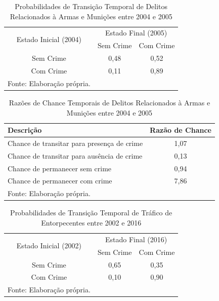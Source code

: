 \documentclass[12pt,openright,oneside,a4paper,english,french,spanish]{abntex2}
\numberwithin{table}{section} %
\numberwithin{figure}{section} %
\begin{document}
\begin{subappendices}
\begin{table}[H]
\centering
\caption{Probabilidades de Transição Temporal de Delitos Relacionados à Armas e Munições entre 2004 e 2005}
        \begin{tabular}{ccc}
            \hline
            \multirow{2}{*}{Estado Inicial (2004)} & \multicolumn{2}{c}{Estado Final (2005)}  \\\cline{2-3} 
                                     & \multicolumn{1}{l}{Sem Crime} & \multicolumn{1}{l}{Com Crime} \\\hline
            {Sem Crime} & {0,48} & {0,52} \\                \hline
            {Com Crime} & {0,11} & {0,89} \\                \hline
            \tiny Fonte: Elaboração própria.
        \end{tabular}
    \label{tab:prob_tempo_rel_arma_2004_2005}
\end{table}

\begin{table}[H]
\centering
\caption{Razões de Chance Temporais de Delitos Relacionados à Armas e Munições entre 2004 e 2005}
        \begin{tabular}{lc}
            \hline
            {\textbf{Descrição}} & {\textbf{Razão de Chance}} \\\hline
            {Chance de transitar para presença de crime} & {1,07} \\
            {Chance de transitar para ausência de crime} & {0,13} \\
            {Chance de permanecer sem crime} & {0,94} \\
            {Chance de permanecer com crime} & {7,86} \\\hline
            \tiny Fonte: Elaboração própria.
        \end{tabular}
    \label{tab:odds_tempo_rel_arma_2004_2005}
\end{table}
















\begin{table}[H]
\centering
\caption{Probabilidades de Transição Temporal de Tráfico de Entorpecentes entre 2002 e 2016}
        \begin{tabular}{ccc}
            \hline
            \multirow{2}{*}{Estado Inicial (2002)} & \multicolumn{2}{c}{Estado Final (2016)}  \\\cline{2-3} 
                                     & \multicolumn{1}{l}{Sem Crime} & \multicolumn{1}{l}{Com Crime} \\\hline
            {Sem Crime} & {0,65} & {0,35} \\                \hline
            {Com Crime} & {0,10} & {0,90} \\                \hline
            \tiny Fonte: Elaboração própria.
        \end{tabular}
    \label{tab:prob_tempo_trafico_2002_2016}
\end{table}


\end{subappendices}
\end{document}
